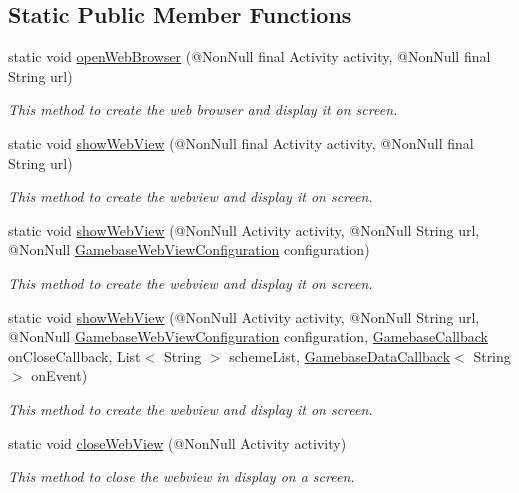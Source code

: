 \subsection*{Static Public Member Functions}
\begin{DoxyCompactItemize}
\item 
static void \hyperlink{classcom_1_1toast_1_1android_1_1gamebase_1_1_gamebase_1_1_web_view_a85a45ba53807b31382812cc72143122f}{open\+Web\+Browser} (@Non\+Null final Activity activity, @Non\+Null final String url)
\begin{DoxyCompactList}\small\item\em This method to create the web browser and display it on screen. \end{DoxyCompactList}\item 
static void \hyperlink{classcom_1_1toast_1_1android_1_1gamebase_1_1_gamebase_1_1_web_view_ae3429d5340c6164295dc3ce3c3eb1b4c}{show\+Web\+View} (@Non\+Null final Activity activity, @Non\+Null final String url)
\begin{DoxyCompactList}\small\item\em This method to create the webview and display it on screen. \end{DoxyCompactList}\item 
static void \hyperlink{classcom_1_1toast_1_1android_1_1gamebase_1_1_gamebase_1_1_web_view_acb06909cde1d3338d7a7c852b9b76e76}{show\+Web\+View} (@Non\+Null Activity activity, @Non\+Null String url, @Non\+Null \hyperlink{classcom_1_1toast_1_1android_1_1gamebase_1_1_gamebase_web_view_configuration}{Gamebase\+Web\+View\+Configuration} configuration)
\begin{DoxyCompactList}\small\item\em This method to create the webview and display it on screen. \end{DoxyCompactList}\item 
static void \hyperlink{classcom_1_1toast_1_1android_1_1gamebase_1_1_gamebase_1_1_web_view_a6fb5730161a90d2f5d5d53efa80f84df}{show\+Web\+View} (@Non\+Null Activity activity, @Non\+Null String url, @Non\+Null \hyperlink{classcom_1_1toast_1_1android_1_1gamebase_1_1_gamebase_web_view_configuration}{Gamebase\+Web\+View\+Configuration} configuration, \hyperlink{interfacecom_1_1toast_1_1android_1_1gamebase_1_1_gamebase_callback}{Gamebase\+Callback} on\+Close\+Callback, List$<$ String $>$ scheme\+List, \hyperlink{interfacecom_1_1toast_1_1android_1_1gamebase_1_1_gamebase_data_callback}{Gamebase\+Data\+Callback}$<$ String $>$ on\+Event)
\begin{DoxyCompactList}\small\item\em This method to create the webview and display it on screen. \end{DoxyCompactList}\item 
static void \hyperlink{classcom_1_1toast_1_1android_1_1gamebase_1_1_gamebase_1_1_web_view_ac34aa05ab2a46ea437f0c8d44c8395de}{close\+Web\+View} (@Non\+Null Activity activity)
\begin{DoxyCompactList}\small\item\em This method to close the webview in display on a screen. \end{DoxyCompactList}\end{DoxyCompactItemize}


